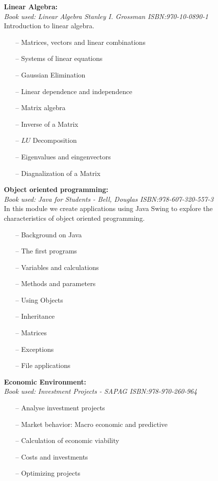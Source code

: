 \documentclass{article}
\begin{document}
\textbf{Linear Algebra:}\\
  \emph{Book used: Linear Algebra Stanley I. Grossman ISBN:970-10-0890-1}\\
  Introduction to linear algebra.
  \begin{itemize}
     \setlength\itemsep{0pt}
     \item[--]  Matrices, vectors and linear combinations
     \item[--] Systems of linear equations
     \item[--] Gaussian Elimination
     \item[--] Linear dependence and independence
     \item[--] Matrix algebra
     \item[--] Inverse of a Matrix
     \item[--] $LU$ Decomposition
     \item[--] Eigenvalues and eingenvectors
     \item[--] Diagnalization of a Matrix
  \end{itemize}
\newpage
\textbf{Object oriented programming:}\\
    \emph{Book used: Java for Students - Bell, Douglas    ISBN:978-607-320-557-3}\\
    In this module we create applications using Java Swing to expĺore the
    characteristics of object oriented programming.
    \begin{itemize}
     \setlength\itemsep{0pt}
        \item[--] Background on Java
        \item[--] The first programs
        \item[--] Variables and calculations
        \item[--] Methods and parameters
        \item[--] Using Objects
        \item[--] Inheritance
        \item[--] Matrices
        \item[--] Exceptions
        \item[--] File applications
    \end{itemize}
      
\textbf{Economic Environment:}\\
    \emph{Book used: Investment Projects - SAPAG ISBN:978-970-260-964}
    \begin{itemize}
     \setlength\itemsep{0pt}
        \item[--] Analyse investment projects
        \item[--] Market behavior: Macro economic and predictive
        \item[--] Calculation of economic viability
        \item[--] Costs and investments
        \item[--] Optimizing projects
    \end{itemize}
 
\end{document}
